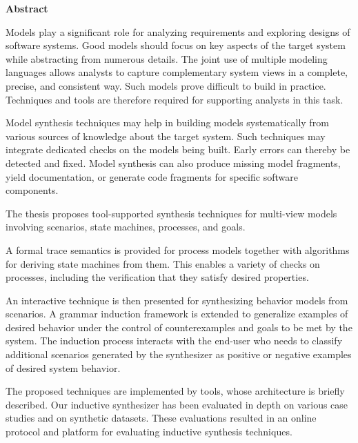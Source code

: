 \begin{center}
\textbf{\large Abstract}
\end{center}

Models play a significant role for analyzing requirements and exploring designs of software systems. Good models should focus on key aspects of the target system while abstracting from numerous details. The joint use of multiple modeling languages allows analysts to capture complementary system views in a complete, precise, and consistent way. Such models prove difficult to build in practice. Techniques and tools are therefore required for supporting analysts in this task.

Model synthesis techniques may help in building models systematically from various sources of knowledge about the target system. Such techniques may integrate dedicated checks on the models being built. Early errors can thereby be detected and fixed. Model synthesis can also produce missing model fragments, yield documentation, or generate code fragments for specific software components.

The thesis proposes tool-supported synthesis techniques for multi-view models involving scenarios, state machines, processes, and goals. 

A formal trace semantics is provided for process models together with algorithms for deriving state machines from them. This enables a variety of checks on processes, including the verification that they satisfy desired properties.

An interactive technique is then presented for synthesizing behavior models from scenarios. A grammar induction framework is extended to generalize examples of desired behavior under the control of counterexamples and goals to be met by the system. The induction process interacts with the end-user who needs to classify additional scenarios generated by the synthesizer as positive or negative examples of desired system behavior.

The proposed techniques are implemented by tools, whose architecture is briefly described. Our inductive synthesizer has been evaluated in depth on various case studies and on synthetic datasets. These evaluations resulted in an online protocol and platform for evaluating inductive synthesis techniques.
